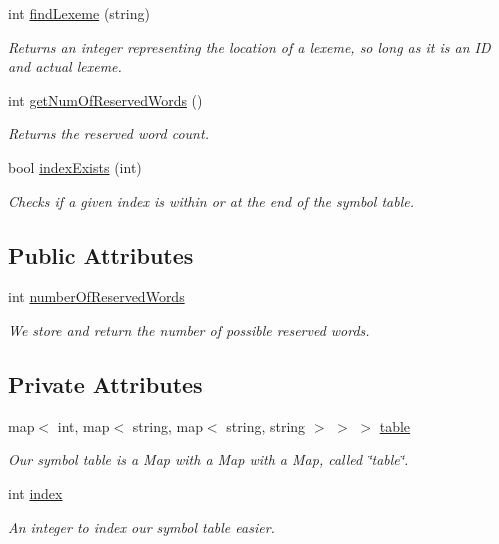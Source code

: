 \begin{DoxyCompactItemize}
int \hyperlink{classSymbolTable_a33fa9fe363246a0b54e9f58191ad931e}{findLexeme} (string)
\begin{DoxyCompactList}\small\item\em Returns an integer representing the location of a lexeme, so long as it is an ID and actual lexeme. \item\end{DoxyCompactList}\item 
int \hyperlink{classSymbolTable_a218f832e3d8b4d37cb3aee7af732a0c6}{getNumOfReservedWords} ()
\begin{DoxyCompactList}\small\item\em Returns the reserved word count. \item\end{DoxyCompactList}\item 
bool \hyperlink{classSymbolTable_a70c8b5e2a159350ffefffffbf6d974ee}{indexExists} (int)
\begin{DoxyCompactList}\small\item\em Checks if a given index is within or at the end of the symbol table. \item\end{DoxyCompactList}\end{DoxyCompactItemize}
\subsection*{Public Attributes}
\begin{DoxyCompactItemize}
\item 
int \hyperlink{classSymbolTable_ac98627cea258b0931be5286aacb1f478}{numberOfReservedWords}
\begin{DoxyCompactList}\small\item\em We store and return the number of possible reserved words. \item\end{DoxyCompactList}\end{DoxyCompactItemize}
\subsection*{Private Attributes}
\begin{DoxyCompactItemize}
\item 
map$<$ int, map$<$ string, map$<$ string, string $>$ $>$ $>$ \hyperlink{classSymbolTable_a96f585bb42df3aad2e833e95681f0727}{table}
\begin{DoxyCompactList}\small\item\em Our symbol table is a Map with a Map with a Map, called \char`\"{}table\char`\"{}. \item\end{DoxyCompactList}\item 
int \hyperlink{classSymbolTable_a6e85689256b178941b87f51e570a6c1e}{index}
\begin{DoxyCompactList}\small\item\em An integer to index our symbol table easier. \item\end{DoxyCompactList}\end{DoxyCompactItemize}


